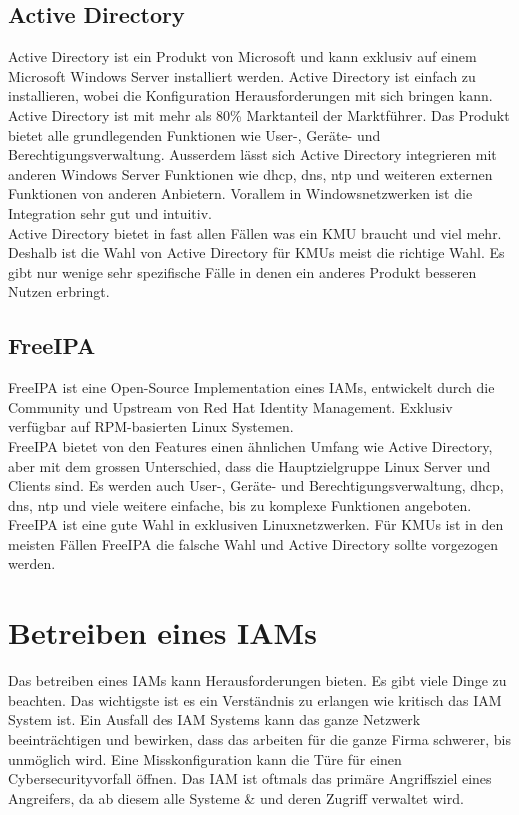 \subsection{Active Directory}
Active Directory ist ein Produkt von Microsoft und kann exklusiv auf einem Microsoft Windows Server installiert werden. Active Directory ist einfach zu installieren, wobei die Konfiguration Herausforderungen mit sich bringen kann.\\

Active Directory ist mit mehr als 80\% Marktanteil der Marktführer.
Das Produkt bietet alle grundlegenden Funktionen wie User-, Geräte- und Berechtigungsverwaltung.
Ausserdem lässt sich Active Directory integrieren mit anderen Windows Server Funktionen wie \acrshort{dhcp}, \acrshort{dns}, \acrshort{ntp} und weiteren externen Funktionen von anderen Anbietern.
Vorallem in Windowsnetzwerken ist die Integration sehr gut und intuitiv.\\


Active Directory bietet in fast allen Fällen was ein KMU braucht und viel mehr. Deshalb ist die Wahl von Active Directory für KMUs meist die richtige Wahl. Es gibt nur wenige sehr spezifische Fälle in denen ein anderes Produkt besseren Nutzen erbringt.


\subsection{FreeIPA}
FreeIPA ist eine Open-Source Implementation eines IAMs, entwickelt durch die Community und Upstream von Red Hat Identity Management. Exklusiv verfügbar auf RPM-basierten Linux Systemen.\\

FreeIPA bietet von den Features einen ähnlichen Umfang wie Active Directory, aber mit dem grossen Unterschied, dass die Hauptzielgruppe Linux Server und Clients sind. Es werden auch User-, Geräte- und Berechtigungsverwaltung, \acrshort{dhcp}, \acrshort{dns}, \acrshort{ntp} und viele weitere einfache, bis zu komplexe Funktionen angeboten.\\

FreeIPA ist eine gute Wahl in exklusiven Linuxnetzwerken. Für KMUs ist in den meisten Fällen FreeIPA die falsche Wahl und Active Directory sollte vorgezogen werden.


\section{Betreiben eines IAMs}
Das betreiben eines IAMs kann Herausforderungen bieten.
Es gibt viele Dinge zu beachten.
Das wichtigste ist es ein Verständnis zu erlangen wie kritisch das IAM System ist.
Ein Ausfall des IAM Systems kann das ganze Netzwerk beeinträchtigen und bewirken, dass das arbeiten für die ganze Firma schwerer, bis unmöglich wird.
Eine Misskonfiguration kann die Türe für einen Cybersecurityvorfall öffnen.
Das IAM ist oftmals das primäre Angriffsziel eines Angreifers, da ab diesem alle Systeme \& und deren Zugriff verwaltet wird.\\

